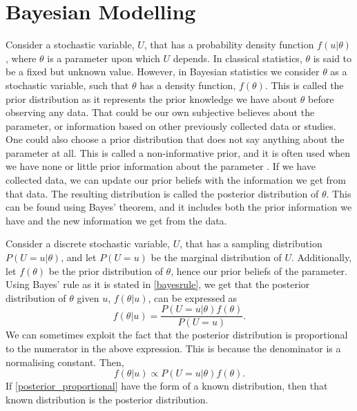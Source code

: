 \section{Bayesian Modelling}
\label{theory_bayesian_modelling}
Consider a stochastic variable, $U$, that has a probability density function $f(u|\theta)$, where $\theta$ is a parameter upon which $U$ depends. In classical statistics, $\theta$ is said to be a fixed but unknown value. However, in Bayesian statistics we consider $\theta$ as a stochastic variable, such that $\theta$ has a density function, $f(\theta)$. This is called the prior distribution as it represents the prior knowledge we have about $\theta$ before observing any data. That could be our own subjective believes about the parameter, or information based on other previously collected data or studies. One could also choose a prior distribution that does not say anything about the parameter at all. This is called a non-informative prior, and it is often used when we have none or little prior information about the parameter \citep{givens2012computational}. 
If we have collected data, we can update our prior beliefs with the information we get from that data. The resulting distribution is called the posterior distribution of $\theta$. This can be found using Bayes' theorem, and it includes both the prior information we have and the new information we get from the data. 

Consider a discrete stochastic variable, $U$, that has a sampling distribution $P(U=u|\theta)$, and let $P(U=u)$ be the marginal distribution of $U$. Additionally, let $f(\theta)$ be the prior distribution of $\theta$, hence our prior beliefs of the parameter. Using Bayes' rule as it is stated in \eqref{bayesrule}, we get that the posterior distribution of $\theta$ given $u$, $f(\theta|u)$, can be expressed as \citep{statinf}
\begin{equation*}
    f(\theta|u) = \frac{P(U=u|\theta)f(\theta)}{P(U=u)}.
\end{equation*}
We can sometimes exploit the fact that the posterior distribution is proportional to the numerator in the above expression. This is because the denominator is a normalising constant. Then,
\begin{equation}
    \label{posterior_proportional}
    f(\theta|u) \propto P(U=u|\theta)f(\theta).
\end{equation}
If \eqref{posterior_proportional} have the form of a known distribution, then that known distribution is the posterior distribution. 

